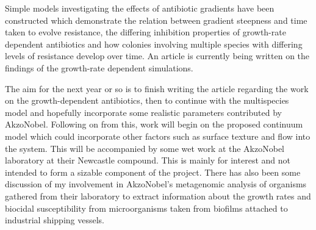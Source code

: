 \documentclass[a4paper,12pt]{article}
\begin{document}
Simple models investigating the effects of antibiotic gradients have been constructed which demonstrate the relation between gradient steepness and time taken to evolve resistance, 
the differing inhibition properties of growth-rate dependent antibiotics and how colonies involving multiple species with differing levels of resistance develop over time.  An 
article is currently being written on the findings of the growth-rate dependent simulations.

The aim for the next year or so is to finish writing the article regarding the work on the growth-dependent antibiotics, then to continue with the multispecies
model and hopefully incorporate some realistic parameters contributed by AkzoNobel.  Following on from this, work will begin on the proposed
continuum model which could incorporate other factors such as surface texture and flow into the system.  This will be accompanied by some wet work at the AkzoNobel laboratory
at their Newcastle compound.  This is mainly for interest and not intended to form a sizable component of the project.  There has also been some discussion of
my involvement in AkzoNobel's metagenomic analysis of organisms gathered from their laboratory to extract information about the growth rates and biocidal susceptibility from 
microorganisms taken from biofilms attached to industrial shipping vessels.


\pagebreak
\newpage


\end{document}
